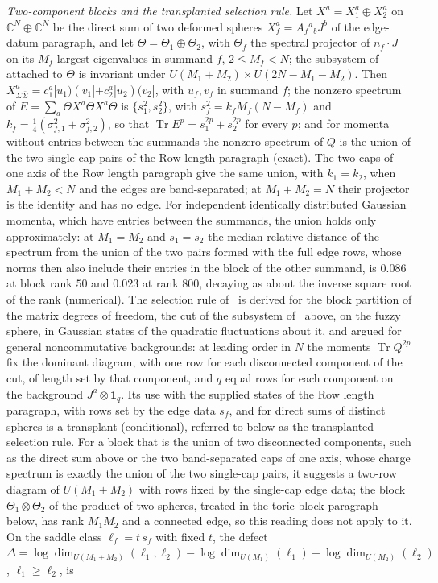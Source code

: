 \emph{Two-component blocks and the transplanted selection rule.} Let \(X^a=X^a_1\oplus X^a_2\) on \(\mathbb C^N\oplus\mathbb C^N\) be the direct sum of two deformed spheres \(X^a_f=A_f{}^a{}_bJ^b\) of the edge-datum paragraph, and let \(\Theta=\Theta_1\oplus\Theta_2\), with \(\Theta_f\) the spectral projector of \(n_f\cdot J\) on its \(M_f\) largest eigenvalues in summand \(f\), \(2\le M_f<N\); the subsystem of~\cite{FlissFrenkelHartnollSoni2025} attached to \(\Theta\) is invariant under \(U(M_1+M_2)\times U(2N-M_1-M_2)\). Then \(X^a_{\Sigma\bar\Sigma}=c^a_1|u_1)(v_1|+c^a_2|u_2)(v_2|\), with \(u_f,v_f\) in summand \(f\); the nonzero spectrum of \(E=\sum_a\Theta X^a\bar\Theta X^a\Theta\) is \(\{s_1^2,s_2^2\}\), with \(s_f^2=k_fM_f(N-M_f)\) and \(k_f=\tfrac14(\sigma_{f,1}^2+\sigma_{f,2}^2)\), so that \(\operatorname{Tr}E^p=s_1^{2p}+s_2^{2p}\) for every \(p\); and for momenta without entries between the summands the nonzero spectrum of \(Q\) is the union of the two single-cap pairs of the Row length paragraph (exact). The two caps of one axis of the Row length paragraph give the same union, with \(k_1=k_2\), when \(M_1+M_2<N\) and the edges are band-separated; at \(M_1+M_2=N\) their projector is the identity and has no edge. For independent identically distributed Gaussian momenta, which have entries between the summands, the union holds only approximately: at \(M_1=M_2\) and \(s_1=s_2\) the median relative distance of the spectrum from the union of the two pairs formed with the full edge rows, whose norms then also include their entries in the block of the other summand, is \(0.086\) at block rank \(50\) and \(0.023\) at rank \(800\), decaying as about the inverse square root of the rank (numerical). The selection rule of~\cite{Frenkel2023EdgeModes} is derived for the block partition of the matrix degrees of freedom, the cut of the subsystem of~\cite{FlissFrenkelHartnollSoni2025} above, on the fuzzy sphere, in Gaussian states of the quadratic fluctuations about it, and argued for general noncommutative backgrounds: at leading order in \(N\) the moments \(\operatorname{Tr}Q^{2p}\) fix the dominant diagram, with one row for each disconnected component of the cut, of length set by that component, and \(q\) equal rows for each component on the background \(J^a\otimes\mathbf 1_q\). Its use with the supplied states of the Row length paragraph, with rows set by the edge data \(s_f\), and for direct sums of distinct spheres is a transplant (conditional), referred to below as the transplanted selection rule. For a block that is the union of two disconnected components, such as the direct sum above or the two band-separated caps of one axis, whose charge spectrum is exactly the union of the two single-cap pairs, it suggests a two-row diagram of \(U(M_1+M_2)\) with rows fixed by the single-cap edge data; the block \(\Theta_1\otimes\Theta_2\) of the product of two spheres, treated in the toric-block paragraph below, has rank \(M_1M_2\) and a connected edge, so this reading does not apply to it. On the saddle class \(\ell_f=t\,s_f\) with fixed \(t\), the defect \(\Delta=\log\dim_{U(M_1+M_2)}(\ell_1,\ell_2)-\log\dim_{U(M_1)}(\ell_1)-\log\dim_{U(M_2)}(\ell_2)\), \(\ell_1\ge\ell_2\), is 